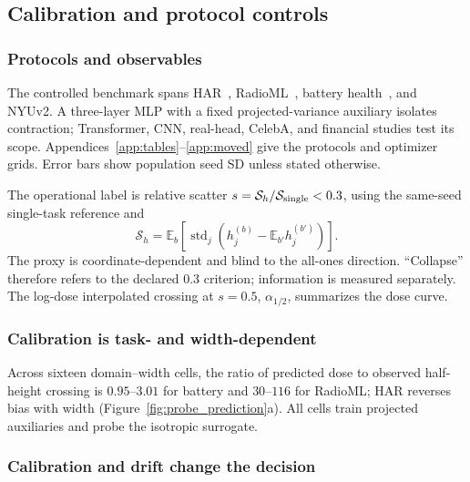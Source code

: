 \subsection{Calibration and protocol controls}\label{app:probe_controls}

\subsubsection{Protocols and observables}\label{sec:unified_protocol}

The controlled benchmark spans HAR~\citep{ucihar}, RadioML~\citep{radioml}, battery health~\citep{nasa_battery}, and NYUv2. A three-layer MLP with a fixed projected-variance auxiliary isolates contraction; Transformer, CNN, real-head, CelebA, and financial studies test its scope. Appendices~\ref{app:tables}--\ref{app:moved} give the protocols and optimizer grids. Error bars show population seed SD unless stated otherwise.

The operational label is relative scatter $s=\mathcal S_h/\mathcal S_{\rm single}<0.3$, using the same-seed single-task reference and
\begin{equation}
 \mathcal S_h=\mathbb E_b\!\left[\operatorname{std}_j\!\left(h_j^{(b)}-\mathbb E_{b'}h_j^{(b')}\right)\right].
 \label{eq:cross_sample_scatter}
\end{equation}
The proxy is coordinate-dependent and blind to the all-ones direction. ``Collapse'' therefore refers to the declared $0.3$ criterion; information is measured separately. The log-dose interpolated crossing at $s=0.5$, $\alpha_{1/2}$, summarizes the dose curve.

\subsubsection{Calibration is task- and width-dependent}\label{sec:validation}\label{sec:har}\label{sec:radioml}\label{sec:battery}\label{sec:nyu}\label{sec:capacity_law}

Across sixteen domain--width cells, the ratio of predicted dose to observed half-height crossing is $0.95$--$3.01$ for battery and $30$--$116$ for RadioML; HAR reverses bias with width (Figure~\ref{fig:probe_prediction}a). All cells train projected auxiliaries and probe the isotropic surrogate.

\subsubsection{Calibration and drift change the decision}\label{sec:negatives}

